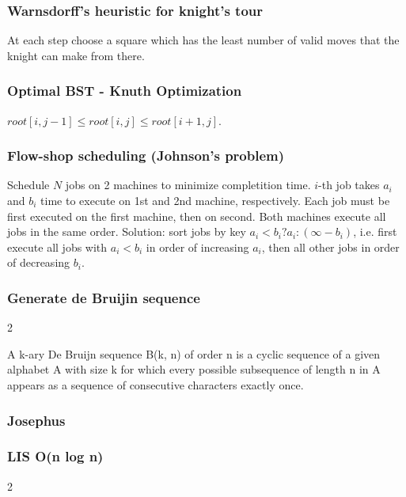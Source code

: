 \documentclass[a4paper,12pt]{article}
\newcommand\includefile[4]{
  \subsubsection{#2}
  \begin{multicols}{2}
    
  \end{multicols}
}
\begin{document}
\subsubsection{Warnsdorff’s heuristic for knight’s tour}
At each step choose a square which has the least number of valid moves that the knight can make from there.

\subsubsection{Optimal BST - Knuth Optimization}
$root[i, j - 1] \leq root[i, j] \leq root[i + 1, j]$.

\subsubsection{Flow-shop scheduling (Johnson’s problem)}
Schedule $N$ jobs on 2 machines to minimize completition time. $i$-th job takes $a_i$ and $b_i$ time to execute on 1st and 2nd machine, respectively.
Each job must be first executed on the first machine, then on second. Both machines execute all jobs in the same order. Solution: sort jobs by key $a_i < b_i ? a_i : (\infty - b_i)$,
i.e. first execute all jobs with $a_i < b_i$ in order of increasing $a_i$, then all other jobs in order of decreasing $b_i$.

\includefile{c++}{Generate de Bruijin sequence}{misc}{debruijn.cpp}
A k-ary De Bruijn sequence B(k, n) of order n is a cyclic sequence of a given alphabet A with size k for which every possible subsequence of length n in A appears as a sequence of consecutive characters exactly once.

\subsubsection{Josephus}


\newpage

\includefile{c++}{LIS O(n log n)}{misc}{lis.cpp}
\end{document}
